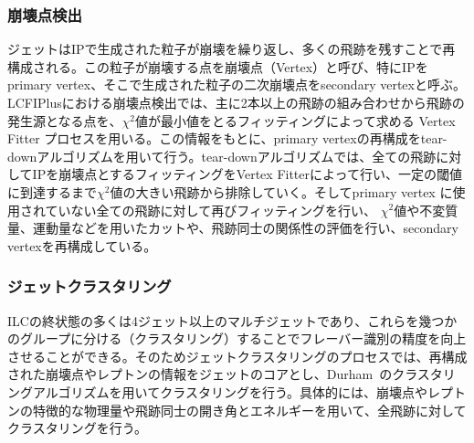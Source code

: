 \subsubsection{崩壊点検出}
ジェットはIPで生成された粒子が崩壊を繰り返し、多くの飛跡を残すことで再構成される。この粒子が崩壊する点を崩壊点（Vertex）と呼び、特にIPをprimary vertex、そこで生成された粒子の二次崩壊点をsecondary vertexと呼ぶ。LCFIPlusにおける崩壊点検出では、主に2本以上の飛跡の組み合わせから飛跡の発生源となる点を、${\chi}^2$値が最小値をとるフィッティングによって求める Vertex Fitter プロセスを用いる。この情報をもとに、primary vertexの再構成をtear-downアルゴリズムを用いて行う。tear-downアルゴリズムでは、全ての飛跡に対してIPを崩壊点とするフィッティングをVertex Fitterによって行い、一定の閾値に到達するまで${\chi}^2$値の大きい飛跡から排除していく。そしてprimary vertex に使用されていない全ての飛跡に対して再びフィッティングを行い、 ${\chi}^2$値や不変質量、運動量などを用いたカットや、飛跡同士の関係性の評価を行い、secondary vertexを再構成している。

\subsubsection{ジェットクラスタリング}
ILCの終状態の多くは4ジェット以上のマルチジェットであり、これらを幾つかのグループに分ける（クラスタリング）することでフレーバー識別の精度を向上させることができる。そのためジェットクラスタリングのプロセスでは、再構成された崩壊点やレプトンの情報をジェットのコアとし、Durham~\cite{durham}のクラスタリングアルゴリズムを用いてクラスタリングを行う。具体的には、崩壊点やレプトンの特徴的な物理量や飛跡同士の開き角とエネルギーを用いて、全飛跡に対してクラスタリングを行う。

